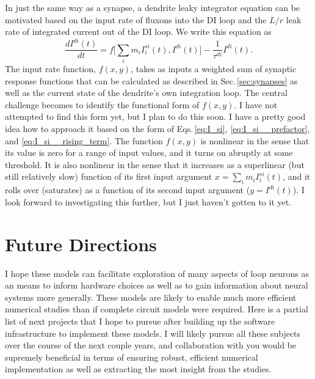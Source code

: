 \documentclass[]{article}
\begin{document}
In just the same way as a synapse, a dendrite leaky integrator equation can be motivated based on the input rate of fluxons into the DI loop and the $L/r$ leak rate of integrated current out of the DI loop. We write this equation as 
\begin{equation}
\label{eq:I_dr}
\frac{dI^{di}(t)}{dt} = f\bigg[\sum_i m_i I_i^{si}(t),I^{di}(t)\bigg]-\frac{1}{\tau^{di}}I^{di}(t).
\end{equation}
The input rate function, $f(x,y)$, takes as inputs a weighted sum of synaptic response functions that can be calculated as described in Sec.\,\ref{sec:synapses} as well as the current state of the dendrite's own integration loop. The central challenge becomes to identify the functional form of $f(x,y)$. I have not attempted to find this form yet, but I plan to do this soon. I have a pretty good idea how to approach it based on the form of Eqs.\,\ref{eq:I_si}, \ref{eq:I_si__prefactor}, and \ref{eq:I_si__rising_term}. The function $f(x,y)$ is nonlinear in the sense that its value is zero for a range of input values, and it turns on abruptly at some threshold. It is also nonlinear in the sense that it increases as a superlinear (but still relatively slow) function of its first input argument $x = \sum_i m_i I_i^{si}(t)$, and it rolls over (saturates) as a function of its second input argument ($y = I^{di}(t)$). I look forward to investigating this further, but I just haven't gotten to it yet.

\section{\label{sec:future_directions}Future Directions}
I hope these models can facilitate exploration of many aspects of loop neurons as an means to inform hardware choices as well as to gain information about neural systems more generally. These models are likely to enable much more efficient numerical studies than if complete circuit models were required. Here is a partial list of next projects that I hope to pursue after building up the software infrastructure to implement these models. I will likely pursue all these subjects over the course of the next couple years, and collaboration with you would be supremely beneficial in terms of ensuring robust, efficient numerical implementation as well as extracting the most insight from the studies. 
\end{document}
